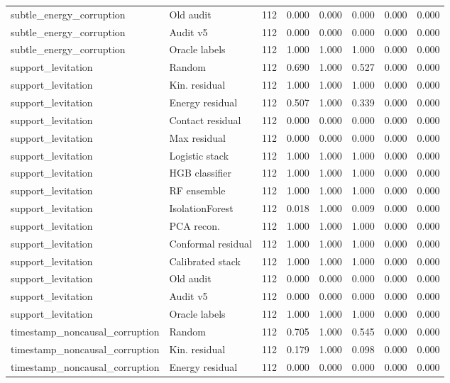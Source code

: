 {\begin{longtable}{llrrrrrr}
subtle\_energy\_corruption & Old audit & 112 & 0.000 & 0.000 & 0.000 & 0.000 & 0.000 \\
subtle\_energy\_corruption & Audit v5 & 112 & 0.000 & 0.000 & 0.000 & 0.000 & 0.000 \\
subtle\_energy\_corruption & Oracle labels & 112 & 1.000 & 1.000 & 1.000 & 0.000 & 0.000 \\
support\_levitation & Random & 112 & 0.690 & 1.000 & 0.527 & 0.000 & 0.000 \\
support\_levitation & Kin. residual & 112 & 1.000 & 1.000 & 1.000 & 0.000 & 0.000 \\
support\_levitation & Energy residual & 112 & 0.507 & 1.000 & 0.339 & 0.000 & 0.000 \\
support\_levitation & Contact residual & 112 & 0.000 & 0.000 & 0.000 & 0.000 & 0.000 \\
support\_levitation & Max residual & 112 & 0.000 & 0.000 & 0.000 & 0.000 & 0.000 \\
support\_levitation & Logistic stack & 112 & 1.000 & 1.000 & 1.000 & 0.000 & 0.000 \\
support\_levitation & HGB classifier & 112 & 1.000 & 1.000 & 1.000 & 0.000 & 0.000 \\
support\_levitation & RF ensemble & 112 & 1.000 & 1.000 & 1.000 & 0.000 & 0.000 \\
support\_levitation & IsolationForest & 112 & 0.018 & 1.000 & 0.009 & 0.000 & 0.000 \\
support\_levitation & PCA recon. & 112 & 1.000 & 1.000 & 1.000 & 0.000 & 0.000 \\
support\_levitation & Conformal residual & 112 & 1.000 & 1.000 & 1.000 & 0.000 & 0.000 \\
support\_levitation & Calibrated stack & 112 & 1.000 & 1.000 & 1.000 & 0.000 & 0.000 \\
support\_levitation & Old audit & 112 & 0.000 & 0.000 & 0.000 & 0.000 & 0.000 \\
support\_levitation & Audit v5 & 112 & 0.000 & 0.000 & 0.000 & 0.000 & 0.000 \\
support\_levitation & Oracle labels & 112 & 1.000 & 1.000 & 1.000 & 0.000 & 0.000 \\
timestamp\_noncausal\_corruption & Random & 112 & 0.705 & 1.000 & 0.545 & 0.000 & 0.000 \\
timestamp\_noncausal\_corruption & Kin. residual & 112 & 0.179 & 1.000 & 0.098 & 0.000 & 0.000 \\
timestamp\_noncausal\_corruption & Energy residual & 112 & 0.000 & 0.000 & 0.000 & 0.000 & 0.000 \\

\end{longtable}}
